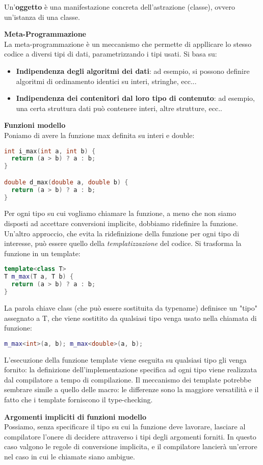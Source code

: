 \documentclass[a4paper,12pt]{article}
\begin{document}
Un'\textbf{oggetto} è una manifestazione concreta dell'astrazione (classe), ovvero un'istanza di una classe.
\par\smallskip
\textbf{Meta-Programmazione} \\
La meta-programmazione è un meccanismo che permette di appllicare lo stesso codice a diversi tipi di dati, parametrizzando i tipi usati. Si basa su:
\begin{itemize}
  \item \textbf{Indipendenza degli algoritmi dei dati}: ad esempio, si possono definire algoritmi di ordinamento identici su interi, stringhe, ecc...
  \item \textbf{Indipendenza dei contenitori dal loro tipo di contenuto}: ad esempio, una certa struttura dati può contenere interi, altre strutture, ecc..
\end{itemize}
\par\smallskip
\textbf{Funzioni modello} \\
Poniamo di avere la funzione max definita su interi e double:
\begin{lstlisting}[language=C++]
int i_max(int a, int b) {
  return (a > b) ? a : b;
}

double d_max(double a, double b) {
  return (a > b) ? a : b;
}
\end{lstlisting}
Per ogni tipo su cui vogliamo chiamare la funzione, a meno che non siamo disposti ad accettare conversioni implicite, dobbiamo ridefinire la funzione.
Un'altro approccio, che evita la ridefinizione della funzione per ogni tipo di interesse, può essere quello della \textit{templatizzazione} del codice.
Si trasforma la funzione in un template:
\begin{lstlisting}[language=C++]
template<class T>
T m_max(T a, T b) {
  return (a > b) ? a : b;
}
\end{lstlisting}
La parola chiave class (che può essere sostituita da typename) definisce un "tipo" assegnato a T, che viene sostitito da qualsiasi tipo venga usato
nella chiamata di funzione:
\begin{lstlisting}[language=C++]
m_max<int>(a, b); m_max<double>(a, b);
\end{lstlisting}
L'esecuzione della funzione template viene eseguita su qualsiasi tipo gli venga fornito: la definizione dell'implementazione specifica ad ogni tipo
viene realizzata dal compilatore a tempo di compilazione. Il meccanismo dei template potrebbe sembrare simile a quello delle macro: le differenze sono
la maggiore versatilità e il fatto che i template forniscono il type-checking.
\par\smallskip
\textbf{Argomenti impliciti di funzioni modello} \\
Possiamo, senza specificare il tipo su cui la funzione deve lavorare, lasciare al compilatore l'onere di decidere attraverso i tipi degli argomenti forniti. In questo
caso valgono le regole di conversione implicita, e il compilatore lancierà un'errore nel caso in cui le chiamate siano ambigue.
\end{document}
